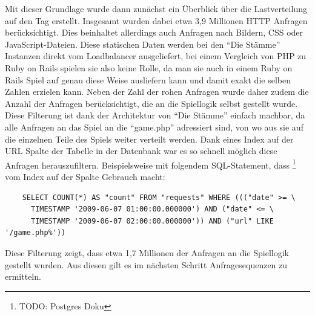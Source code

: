 \documentclass[10pt]{scrartcl}
\begin{document}
  Mit dieser Grundlage wurde dann zunächst ein Überblick über die Lastverteilung auf den Tag erstellt. Insgesamt wurden dabei etwa 3,9 Millionen HTTP Anfragen berücksichtigt. Dies beinhaltet allerdings auch Anfragen nach Bildern,  CSS oder JavaScript-Dateien. Diese statischen Daten werden bei den ``Die Stämme'' Instanzen direkt vom Loadbalancer ausgeliefert, bei einem Vergleich von PHP zu Ruby on Rails spielen sie also keine Rolle, da man sie auch in einem Ruby on Rails Spiel auf genau diese Weise ausliefern kann und damit exakt die selben Zahlen erzielen kann. Neben der Zahl der rohen Anfragen wurde daher zudem die Anzahl der Anfragen berücksichtigt, die an die Spiellogik selbst gestellt wurde. Diese Filterung ist dank der Architektur von ``Die Stämme'' einfach machbar, da alle Anfragen an das Spiel an die ``game.php'' adressiert sind, von wo aus sie  auf die einzelnen Teile des Spiels weiter verteilt werden. Dank eines Index auf der URL Spalte der Tabelle in der Datenbank war es so schnell möglich diese Anfragen herauszufiltern. Beispielsweise mit folgendem SQL-Statement, dass \footnote{TODO: Postgres Doku} vom Index auf der Spalte Gebrauch macht:

  \begin{verbatim}
    SELECT COUNT(*) AS "count" FROM "requests" WHERE ((("date" >= \
      TIMESTAMP '2009-06-07 01:00:00.000000') AND ("date" <= \
      TIMESTAMP '2009-06-07 02:00:00.000000')) AND ("url" LIKE '/game.php%'))
  \end{verbatim}
  
  Diese Filterung zeigt, dass etwa 1,7 Millionen der Anfragen an die Spiellogik   gestellt wurden. Aus diesen gilt es im nächsten Schritt Anfragesequenzen zu ermitteln.
  
\end{document}
